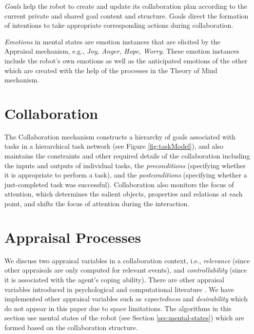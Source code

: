\documentclass{sig-alternate-05-2015}
\begin{document}

\textit{Goals} help the robot to create and update its collaboration plan
according to the current private and shared goal content and structure. Goals
direct the formation of intentions to take appropriate corresponding actions
during collaboration. 


\textit{Emotions} in mental states are emotion instances that are elicited by
the Appraisal mechanism, e.g., \textit{Joy, Anger, Hope, Worry}. These emotion
instances include the robot's own emotions as well as the anticipated emotions
of the other which are created with the help of the processes in the Theory of
Mind mechanism. \\

\section{Collaboration}
The Collaboration mechanism constructs a hierarchy of goals associated with
tasks in a hierarchical task network (see Figure \ref{fig:taskModel}), and also
maintains the constraints and other required details of the collaboration
including the inputs and outputs of individual tasks, the \textit{preconditions}
(specifying whether it is appropriate to perform a task), and the
\textit{postconditions} (specifying whether a just-completed task was
successful). Collaboration also monitors the focus of attention, which
determines the salient objects, properties and relations at each point, and
shifts the focus of attention during the interaction.

\section{Appraisal Processes}

We discuss two appraisal variables in a collaboration context, i.e.,
\textit{relevance} (since other appraisals are only computed for relevant
events), and \textit{controllability} (since it is associated with the agent's
coping ability). There are other appraisal variables introduced in psychological
\cite{scherer:appraisal-processes} and computational literature
\cite{gratch:domain-independent}. We have implemented other appraisal variables
such as \textit{expectedness} \cite{shayganfar:appraisal-short} and
\textit{desirability} \cite{shayganfar:emotional-awareness} which do not appear
in this paper due to space limitations. The algorithms in this section use
mental states of the robot (see Section \ref{sec:mental-states}) which are
formed based on the collaboration structure.
\end{document}
